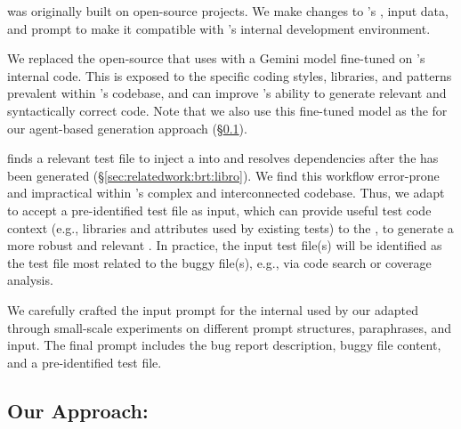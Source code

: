 \libro was originally built on open-source projects. 
We make changes to \libro's \llm, input data, and prompt to make it compatible with \google's internal development environment.

\myparagraph{\llm}
We replaced the open-source \llm that \libro uses with a Gemini model fine-tuned on \google's internal code. 
This \llm is exposed to the specific coding styles, libraries, and patterns prevalent within \google's codebase, and can improve \libro's ability to generate relevant and syntactically correct code. 
Note that we also use this fine-tuned \gemini model as the \codeeditingllm for our agent-based \brt generation approach (\S\ref{sec:approach:agent}). 

\libro finds a relevant test file to inject a \brt into and resolves dependencies after the \brt has been generated (\S\ref{sec:relatedwork:brt:libro}). 
We find this workflow error-prone and impractical within \google's complex and interconnected codebase. 
Thus, we adapt \libro to accept a pre-identified test file as input, which can provide useful test code context (e.g., libraries and attributes used by existing tests) to the \llm, to generate a more robust and relevant \brt. 
In practice, the input test file(s) will be identified as the test file most related to the buggy file(s), e.g., via code search or coverage analysis.


We carefully crafted the input prompt for the internal \llm used by our adapted \libro through small-scale experiments on different prompt structures, paraphrases, and input.
The final prompt includes the bug report description, buggy file content, and a pre-identified test file.





\subsection{Our Approach: \tool}
\label{sec:approach:agent}

